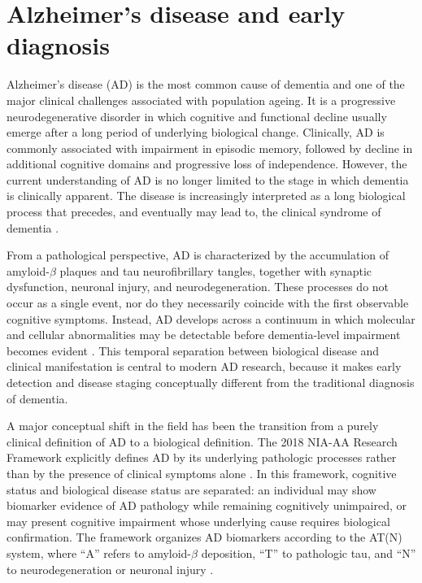 \section{Alzheimer’s disease and early diagnosis}

Alzheimer's disease (AD) is the most common cause of dementia and one of the major clinical challenges associated with population ageing. It is a progressive neurodegenerative disorder in which cognitive and functional decline usually emerge after a long period of underlying biological change. Clinically, AD is commonly associated with impairment in episodic memory, followed by decline in additional cognitive domains and progressive loss of independence. However, the current understanding of AD is no longer limited to the stage in which dementia is clinically apparent. The disease is increasingly interpreted as a long biological process that precedes, and eventually may lead to, the clinical syndrome of dementia \cite{scheltens2021alzheimer,jack2018nia}.

From a pathological perspective, AD is characterized by the accumulation of amyloid-\(\beta\) plaques and tau neurofibrillary tangles, together with synaptic dysfunction, neuronal injury, and neurodegeneration. These processes do not occur as a single event, nor do they necessarily coincide with the first observable cognitive symptoms. Instead, AD develops across a continuum in which molecular and cellular abnormalities may be detectable before dementia-level impairment becomes evident \cite{scheltens2021alzheimer,sperling2011preclinical}. This temporal separation between biological disease and clinical manifestation is central to modern AD research, because it makes early detection and disease staging conceptually different from the traditional diagnosis of dementia.

A major conceptual shift in the field has been the transition from a purely clinical definition of AD to a biological definition. The 2018 NIA-AA Research Framework explicitly defines AD by its underlying pathologic processes rather than by the presence of clinical symptoms alone \cite{jack2018nia}. In this framework, cognitive status and biological disease status are separated: an individual may show biomarker evidence of AD pathology while remaining cognitively unimpaired, or may present cognitive impairment whose underlying cause requires biological confirmation. The framework organizes AD biomarkers according to the AT(N) system, where ``A'' refers to amyloid-\(\beta\) deposition, ``T'' to pathologic tau, and ``N'' to neurodegeneration or neuronal injury \cite{jack2018nia}.

